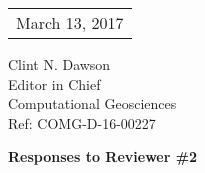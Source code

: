\documentclass[12pt]{article}\usepackage{amsmath, amssymb, graphicx, array}
\begin{document}
\large

%
%
\large




\begin{tabular}{l}
March 13, 2017
\end{tabular}

\bigskip
\begin{flushleft}
Clint N. Dawson\\
Editor in Chief\\
Computational Geosciences\\
Ref: COMG-D-16-00227
\end{flushleft}


\centerline{\bf Responses to Reviewer \#2}

\bigskip
\bigskip
\end{document}
